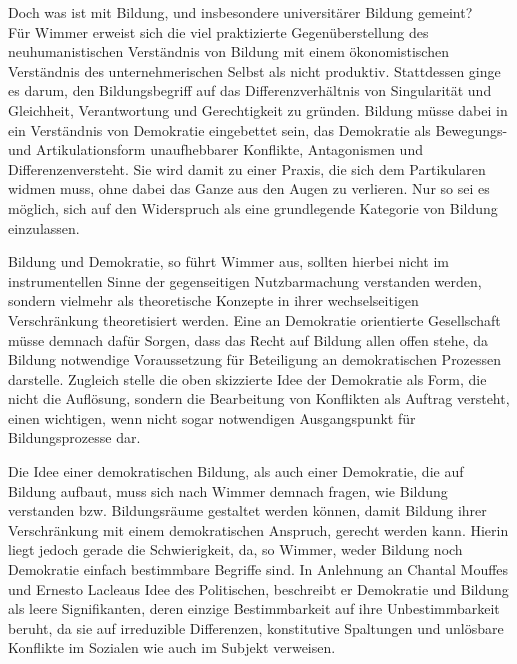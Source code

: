 Doch was ist mit Bildung, und insbesondere universitärer
Bildung gemeint? \\
Für Wimmer erweist sich die viel praktizierte Gegenüberstellung des
neuhumanistischen Verständnis von Bildung mit einem ökonomistischen Verständnis
des unternehmerischen Selbst als nicht produktiv. Stattdessen ginge es darum,
\glqq den Bildungsbegriff auf das Differenzverhältnis von Singularität und
Gleichheit, Verantwortung und Gerechtigkeit zu gründen.\grqq\footnotemark
{} Bildung müsse dabei
in ein Verständnis von Demokratie eingebettet sein, das Demokratie als
\glqq Bewegungs- und Artikulationsform unaufhebbarer Konflikte, Antagonismen und
Differenzen\grqq versteht. Sie wird damit zu einer Praxis, die sich dem
Partikularen widmen muss, ohne dabei das Ganze aus den Augen zu verlieren. Nur
so sei es möglich, sich auf den Widerspruch als eine grundlegende Kategorie von
Bildung einzulassen.

Bildung und Demokratie, so führt Wimmer aus, sollten
hierbei nicht im instrumentellen Sinne der gegenseitigen Nutzbarmachung
verstanden werden, sondern vielmehr als theoretische Konzepte in ihrer
wechselseitigen Verschränkung theoretisiert werden. Eine an Demokratie
orientierte Gesellschaft müsse demnach dafür Sorgen, dass das Recht auf Bildung
allen offen stehe, da Bildung notwendige Voraussetzung für Beteiligung an
demokratischen Prozessen darstelle. Zugleich stelle die oben skizzierte Idee
der Demokratie als Form, die nicht die Auflösung, sondern die Bearbeitung von
Konflikten als Auftrag versteht, einen wichtigen, wenn nicht sogar notwendigen
Ausgangspunkt für Bildungsprozesse dar.\footnotemark {} 

Die Idee einer demokratischen Bildung,
als auch einer Demokratie, die auf Bildung aufbaut, muss sich nach Wimmer
demnach fragen, wie Bildung verstanden bzw. Bildungsräume gestaltet werden
können, damit Bildung ihrer Verschränkung mit einem demokratischen Anspruch,
gerecht werden kann. Hierin liegt jedoch gerade die Schwierigkeit, da, so
Wimmer, weder Bildung noch Demokratie einfach bestimmbare Begriffe sind. In
Anlehnung an Chantal Mouffes und Ernesto Lacleaus Idee des Politischen,
beschreibt er Demokratie und Bildung als leere Signifikanten, deren einzige
Bestimmbarkeit auf ihre Unbestimmbarkeit beruht, da sie \glqq auf irreduzible
Differenzen, konstitutive Spaltungen und unlösbare Konflikte im Sozialen wie
auch im Subjekt\grqq\footnotemark {} verweisen. 

